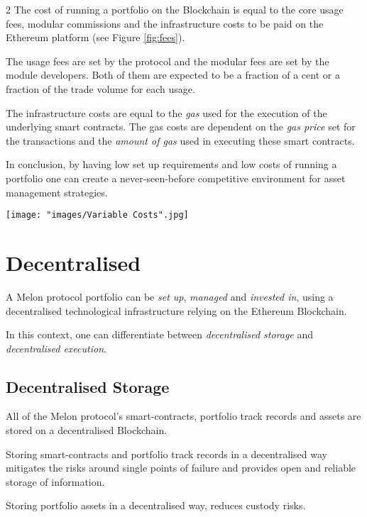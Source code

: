 \documentclass[9pt,oneside]{amsart}
\theoremstyle{plain}
\begin{document}
\begin{multicols}{2}
The cost of running a portfolio on the Blockchain is equal to the core usage fees, modular commissions and the infrastructure costs to be paid on the Ethereum platform (see Figure \ref{fig:fees}). 

The usage fees are set by the protocol and the modular fees are set by the module developers. Both of them are expected to be a fraction of a cent or a fraction of the trade volume for each usage.

The infrastructure costs are equal to the \textit{gas} used for the execution of the underlying smart contracts. The gas costs are dependent on the \textit{gas price} set for the transactions and the \textit{amount of gas} used in executing these smart contracts\cite{yellow}.

In conclusion, by having low set up requirements and low costs of running a portfolio one can create a never-seen-before competitive environment for asset management strategies.

\begin{figure*}[ht!]
	\centering
	\texttt{[image: "images/Variable Costs".jpg]}
	\caption{Variable Costs of a Melon protocol portfolio}
	\label{fig:fees}
\end{figure*}

\section{Decentralised}\label{sec:decentralised}

A Melon protocol portfolio can be \textit{set up}, \textit{managed} and \textit{invested in}, using a decentralised technological infrastructure relying on the Ethereum Blockchain.

In this context, one can differentiate between \textit{decentralised storage} and \textit{decentralised execution}.

\subsection{Decentralised Storage}

All of the Melon protocol's smart-contracts, portfolio track records and assets are stored on a decentralised Blockchain. 

Storing smart-contracts and portfolio track records in a decentralised way mitigates the risks around single points of failure and provides open and reliable storage of information.

Storing portfolio assets in a decentralised way, reduces custody risks.


\end{multicols}
\end{document}
